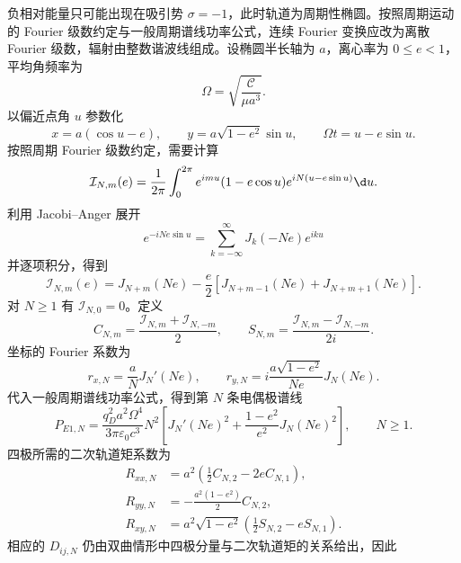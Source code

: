 负相对能量只可能出现在吸引势 $\sigma=-1$，此时轨道为周期性椭圆。按照周期运动的 Fourier 级数约定与一般周期谱线功率公式，连续 Fourier 变换应改为离散 Fourier 级数，辐射由整数谐波线组成。设椭圆半长轴为 $a$，离心率为 $0\leq e<1$，平均角频率为
\begin{equation*}
	\Omega=\sqrt{\frac{\mathcal C}{\mu a^3}}.
\end{equation*}
以偏近点角 $u$ 参数化
\begin{equation*}
	x=a(\cos u-e),
	\qquad
	y=a\sqrt{1-e^2}\sin u,
	\qquad
	\Omega t=u-e\sin u.
\end{equation*}
按照周期 Fourier 级数约定，需要计算
\begin{equation*}
	\mathcal I_{N,m}(e)
	=\frac{1}{2\pi}\int_0^{2\pi}
	e^{imu}(1-e\cos u)e^{iN(u-e\sin u)}\d u.
\end{equation*}
利用 Jacobi--Anger 展开
\begin{equation*}
	e^{-iNe\sin u}=\sum_{k=-\infty}^{\infty}J_k(-Ne)e^{iku}
\end{equation*}
并逐项积分，得到
\begin{equation*}
	\mathcal I_{N,m}(e)
	=J_{N+m}(Ne)-\frac{e}{2}
	\left[J_{N+m-1}(Ne)+J_{N+m+1}(Ne)\right].
\end{equation*}
对 $N\geq1$ 有 $\mathcal I_{N,0}=0$。定义
\begin{equation*}
	C_{N,m}=\frac{\mathcal I_{N,m}+\mathcal I_{N,-m}}{2},
	\qquad
	S_{N,m}=\frac{\mathcal I_{N,m}-\mathcal I_{N,-m}}{2i}.
\end{equation*}
坐标的 Fourier 系数为
\begin{equation*}
	r_{x,N}=\frac{a}{N}J_N'(Ne),
	\qquad
	r_{y,N}=i\frac{a\sqrt{1-e^2}}{Ne}J_N(Ne).
\end{equation*}
代入一般周期谱线功率公式，得到第 $N$ 条电偶极谱线
\begin{equation*}
	P_{E1,N}
	=\frac{q_D^2a^2\Omega^4}{3\pi\varepsilon_0c^3}N^2
	\left[J_N'(Ne)^2+\frac{1-e^2}{e^2}J_N(Ne)^2\right],
	\qquad N\geq1.
\end{equation*}
四极所需的二次轨道矩系数为
\begin{equation*}
	\begin{aligned}
	R_{xx,N}&=a^2\left(\frac{1}{2}C_{N,2}-2eC_{N,1}\right),\\
	R_{yy,N}&=-\frac{a^2(1-e^2)}{2}C_{N,2},\\
	R_{xy,N}&=a^2\sqrt{1-e^2}
	\left(\frac{1}{2}S_{N,2}-eS_{N,1}\right).
	\end{aligned}
\end{equation*}
相应的 $D_{ij,N}$ 仍由双曲情形中四极分量与二次轨道矩的关系给出，因此
